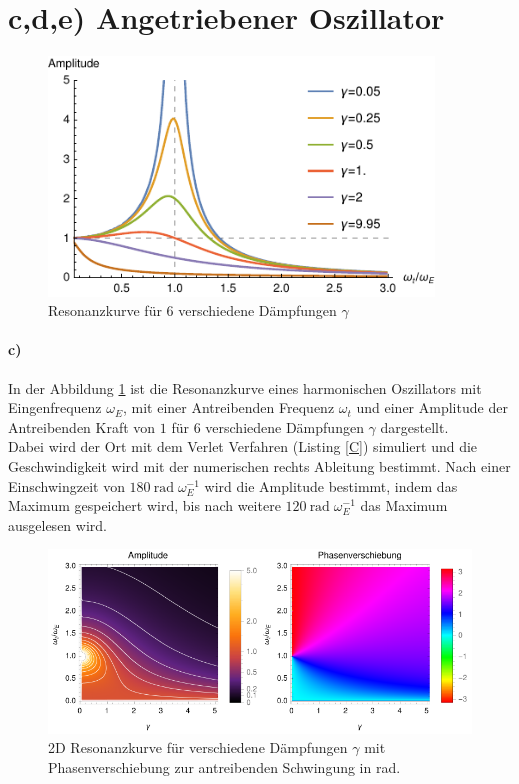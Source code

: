 \section*{c,d,e) Angetriebener Oszillator}
\begin{figure}[t]
	\centering
	\includegraphics[width=290pt]{C_Seite.pdf}
	\caption{Resonanzkurve für 6 verschiedene Dämpfungen $\gamma$}
	\label{fig:seite}
\end{figure}

\paragraph*{c)} In der Abbildung \ref{fig:seite} ist die Resonanzkurve eines harmonischen Oszillators mit Eingenfrequenz $\omega_E$, mit einer Antreibenden Frequenz $\omega_t$ und einer Amplitude der Antreibenden Kraft von $1$ für 6 verschiedene Dämpfungen $\gamma$  dargestellt.\\ 
Dabei wird der Ort mit dem Verlet Verfahren (Listing \ref{C}) simuliert und die Geschwindigkeit wird mit der numerischen rechts Ableitung bestimmt.
Nach einer Einschwingzeit von $\SI{180}{\radian}\;\omega_E^{-1}$ wird die Amplitude bestimmt, indem das Maximum gespeichert wird, bis nach weitere $\SI{120}{\radian}\;\omega_E^{-1}$ das Maximum ausgelesen wird. 

\smallskip

\begin{figure}[p]
	\centering
	\includegraphics[width=450pt]{C_Plot.pdf}
	\caption{2D Resonanzkurve für verschiedene Dämpfungen $\gamma$ mit Phasenverschiebung zur antreibenden Schwingung in \si{\radian}.}
	\label{fig:plot}
\end{figure}
